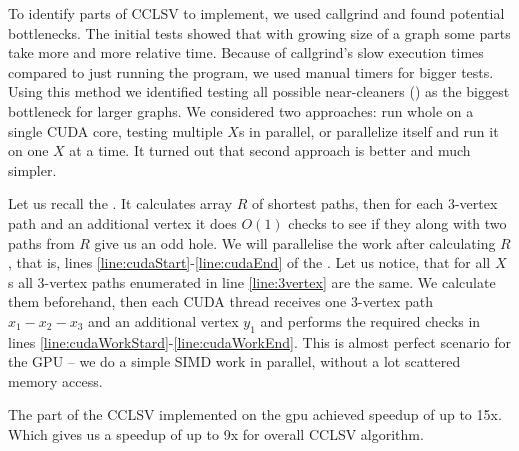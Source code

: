 

To identify parts of CCLSV to implement, we used callgrind and found potential bottlenecks. The initial tests showed that with growing size of a graph some parts take more and more relative time. Because of callgrind's slow execution times compared to just running the program, we used manual timers for bigger tests. Using this method we identified testing all possible near-cleaners () as the biggest bottleneck for larger graphs. We considered two approaches: run whole  on a single CUDA core, testing multiple $X$s in parallel, or parallelize  itself and run it on one $X$ at a time. It turned out that second approach is better and much simpler.

Let us recall the . It calculates array $R$ of shortest paths, then for each 3-vertex path and an additional vertex it does $O(1)$ checks to see if they along with two paths from $R$ give us an odd hole. We will parallelise the work after calculating $R$, that is, lines \ref{line:cudaStart}-\ref{line:cudaEnd} of the . Let us notice, that for all $X$s all 3-vertex paths enumerated in line \ref{line:3vertex} are the same. We calculate them beforehand, then each CUDA thread receives one 3-vertex path $x_1 - x_2 - x_3$ and an additional vertex $y_1$ and performs the required checks in lines \ref{line:cudaWorkStard}-\ref{line:cudaWorkEnd}. This is almost perfect scenario for the GPU -- we do a simple SIMD work in parallel, without a lot scattered memory access.

The part of the CCLSV implemented on the gpu achieved speedup of up to 15x. Which gives us a speedup of up to 9x for overall CCLSV algorithm.

